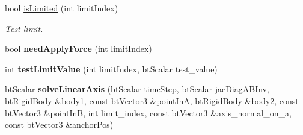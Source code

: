\begin{DoxyCompactItemize}
\item 
bool \hyperlink{classbtTranslationalLimitMotor_ae5bb30b955dcd0923d72642e37f00622}{is\+Limited} (int limit\+Index)
\begin{DoxyCompactList}\small\item\em Test limit. \end{DoxyCompactList}\item 
\mbox{\label{classbtTranslationalLimitMotor_a635a5c4078ef1b5a8fa171071843b62f}} 
bool {\bfseries need\+Apply\+Force} (int limit\+Index)
\item 
\mbox{\label{classbtTranslationalLimitMotor_a74698c3a1b13a97371fd1eff60201f3a}} 
int {\bfseries test\+Limit\+Value} (int limit\+Index, bt\+Scalar test\+\_\+value)
\item 
\mbox{\label{classbtTranslationalLimitMotor_a40857b3a98cd8d8fc986516985726e49}} 
bt\+Scalar {\bfseries solve\+Linear\+Axis} (bt\+Scalar time\+Step, bt\+Scalar jac\+Diag\+A\+B\+Inv, \hyperlink{classbtRigidBody}{bt\+Rigid\+Body} \&body1, const bt\+Vector3 \&point\+InA, \hyperlink{classbtRigidBody}{bt\+Rigid\+Body} \&body2, const bt\+Vector3 \&point\+InB, int limit\+\_\+index, const bt\+Vector3 \&axis\+\_\+normal\+\_\+on\+\_\+a, const bt\+Vector3 \&anchor\+Pos)
\end{DoxyCompactItemize}
